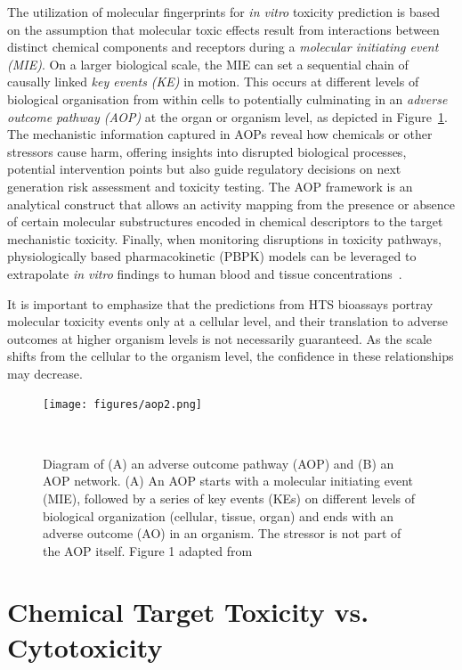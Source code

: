 The utilization of molecular fingerprints for \emph{in vitro} toxicity prediction is based on the assumption that molecular toxic effects result from interactions between distinct chemical components and receptors during a \emph{molecular initiating event (MIE)}. On a larger biological scale, the MIE can set a sequential chain of causally linked \emph{key events (KE)} in motion. This occurs at different levels of biological organisation from within cells to potentially culminating in an \emph{adverse outcome pathway (AOP)} at the organ or organism level, as depicted in Figure~\ref{fig:aop}. The mechanistic information captured in AOPs reveal how chemicals or other stressors cause harm, offering insights into disrupted biological processes, potential intervention points but also guide regulatory decisions on next generation risk assessment and toxicity testing. The AOP framework is an analytical construct that allows an activity mapping from the presence or absence of certain molecular substructures encoded in chemical descriptors to the target mechanistic toxicity. Finally, when monitoring disruptions in toxicity pathways, physiologically based pharmacokinetic (PBPK) models can be leveraged to extrapolate \emph{in vitro} findings to human blood and tissue concentrations~\cite{bell2018}.

It is important to emphasize that the predictions from HTS bioassays portray molecular toxicity events only at a cellular level, and their translation to adverse outcomes at higher organism levels is not necessarily guaranteed. As the scale shifts from the cellular to the organism level, the confidence in these relationships may decrease.

\begin{figure}[htbp]  %
    \centering
    \texttt{[image: figures/aop2.png]}  
    \caption{Diagram of (A) an adverse outcome pathway (AOP) and (B) an AOP network. (A) An AOP starts with a molecular initiating event (MIE), followed by a series of key events (KEs) on different levels of biological organization (cellular, tissue, organ) and ends with an adverse outcome (AO) in an organism. The stressor is not part of the AOP itself. Figure 1 adapted from~\cite{nymark2021}}
~\label{fig:aop} 
\end{figure}


\section{Chemical Target Toxicity vs. Cytotoxicity}\label{sec:cytotoxicity}

